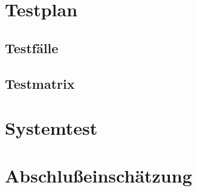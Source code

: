 \section{Testplan}
\subsection{Testfälle}

\subsection{Testmatrix}

\section{Systemtest}

\section{Abschlußeinschätzung}
